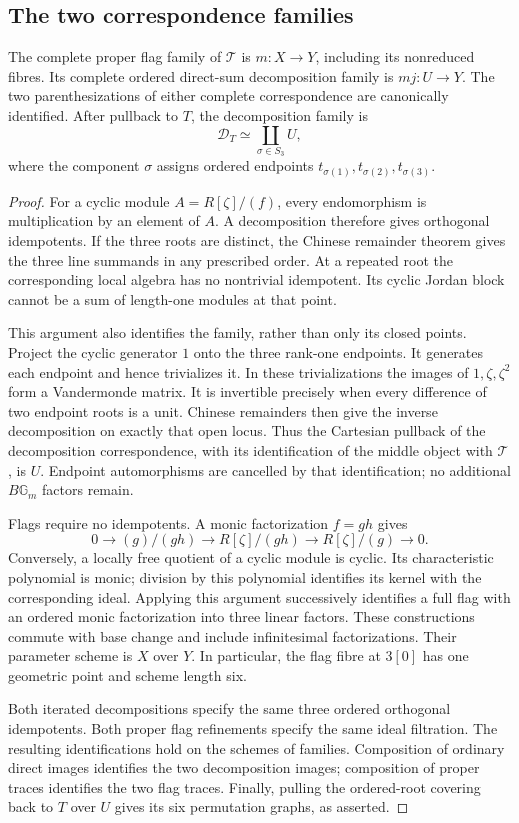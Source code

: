 \subsection{The two correspondence families}

\begin{proposition}\label{cf:families}
The complete proper flag family of $\mathcal T$ is $m:X\to Y$,
including its nonreduced fibres. Its complete ordered direct-sum
decomposition family is $mj:U\to Y$.
The two parenthesizations of either complete correspondence are
canonically identified. After pullback to $T$, the decomposition
family is
\[
 \mathcal D_T\simeq\coprod_{\sigma\in S_3}U,
\]
where the component $\sigma$ assigns ordered endpoints
$t_{\sigma(1)},t_{\sigma(2)},t_{\sigma(3)}$.
\end{proposition}
\begin{proof}
For a cyclic module $A=R[\zeta]/(f)$, every endomorphism is
multiplication by an element of $A$. A decomposition therefore gives
orthogonal idempotents. If the three roots are distinct, the Chinese
remainder theorem gives the three line summands in any prescribed
order. At a repeated root the corresponding local algebra has no
nontrivial idempotent. Its cyclic Jordan block cannot be a sum of
length-one modules at that point.

This argument also identifies the family, rather than only its closed
points. Project the cyclic generator $1$ onto the three rank-one
endpoints. It generates each endpoint and hence trivializes it.
In these trivializations the images of $1,\zeta,\zeta^2$ form a
Vandermonde matrix. It is invertible precisely when every difference
of two endpoint roots is a unit. Chinese remainders then give the
inverse decomposition on exactly that open locus. Thus the Cartesian
pullback of the decomposition correspondence, with its identification
of the middle object with $\mathcal T$, is $U$. Endpoint automorphisms
are cancelled by that identification; no additional
$B\mathbb G_m$ factors remain.

Flags require no idempotents. A monic factorization $f=gh$ gives
\[
 0\longrightarrow (g)/(gh)\longrightarrow R[\zeta]/(gh)
       \longrightarrow R[\zeta]/(g)\longrightarrow0.
\]
Conversely, a locally free quotient of a cyclic module is cyclic.
Its characteristic polynomial is monic; division by this polynomial
identifies its kernel with the corresponding ideal. Applying this
argument successively identifies a full flag with an ordered monic
factorization into three linear factors. These constructions commute
with base change and include infinitesimal factorizations. Their
parameter scheme is $X$ over $Y$. In particular, the flag fibre at
$3[0]$ has one geometric point and scheme length six.

Both iterated decompositions specify the same three ordered orthogonal
idempotents. Both proper flag refinements specify the same ideal
filtration. The resulting identifications hold on the schemes of
families. Composition of ordinary direct images identifies the two
decomposition images; composition of proper traces identifies the two
flag traces. Finally, pulling the ordered-root covering back to $T$
over $U$ gives its six permutation graphs, as asserted.
\end{proof}

